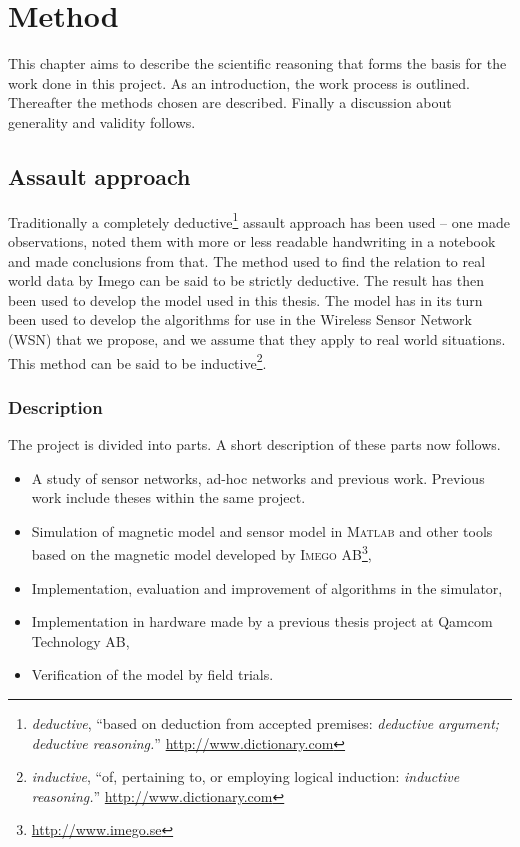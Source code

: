 \cleardoublepage\chapter{Method}
This chapter aims to describe the scientific reasoning that forms the basis for the work done in this project. As an introduction, the work process is outlined. Thereafter the methods chosen are described. Finally a discussion about generality and validity follows.
\section{Assault approach} %
Traditionally a completely deductive\footnote{\textit{deductive}, ``based on deduction from accepted premises: \textit{deductive argument; deductive reasoning.}'' \url{http://www.dictionary.com}} assault approach has been used -- one made observations, noted them with more or less readable handwriting in a notebook and made conclusions from that. The method used to find the relation to real world data by Imego can be said to be strictly deductive. The result has then been used to develop the model used in this thesis. The model has in its turn been used to develop the algorithms for use in the Wireless Sensor Network (WSN) that we propose, and we assume that they apply to real world situations. This method can be said to be inductive\footnote{\textit{inductive}, ``of, pertaining to, or employing logical induction: \textit{inductive reasoning.}'' \url{http://www.dictionary.com}}.

\subsection{Description} %
The project is divided into parts. A short description of these parts now follows.
\begin{itemize}
 \item A study of sensor networks, ad-hoc networks and previous work. Previous work include theses within the same project.
 \item Simulation of magnetic model and sensor model in \textsc{Matlab} and other tools based on the magnetic model developed by \textsc{Imego AB}\footnote{\url{http://www.imego.se}},
 \item Implementation, evaluation and improvement of algorithms in the simulator,
 \item Implementation in hardware made by a previous thesis project at Qamcom Technology AB,
 \item Verification of the model by field trials.
\end{itemize}

